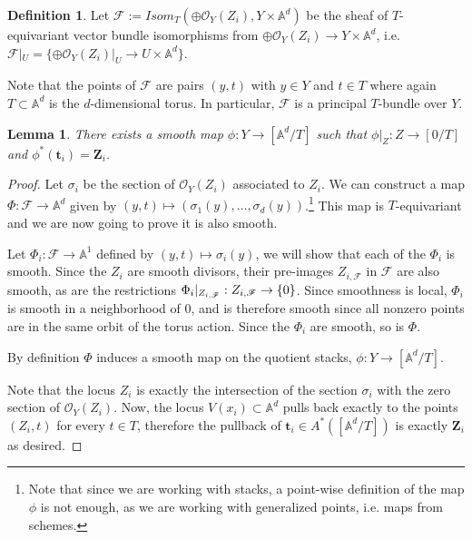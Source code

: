 \documentclass[11pt,oneside,english]{article}
\numberwithin{equation}{section}
\renewcommand*{\to}{\mathchoice{\longrightarrow}{\rightarrow}{\rightarrow}{\rightarrow}}
\newtheorem{lemma}[theorem]{Lemma}
\theoremstyle{definition}
\newtheorem{definition}[theorem]{Definition}
\newcommand{\ra}{\rightarrow}
\newcommand\A{\mathbb{A}}
\begin{document}
\begin{definition} Let $\mathscr{F}:=Isom_T(\oplus \mathcal{O}_Y(Z_i), Y \times \A^d )$ be the sheaf of $T$-equivariant vector bundle isomorphisms from $\oplus \mathcal O_Y(Z_i) \rightarrow Y \times \mathbb A^d$, i.e. $\mathscr F|_U = \{\oplus \mathcal{O}_Y(Z_i)|_U \ra U \times \A^d \}$.   
\end{definition}


Note that the points of $\mathscr F
$ are pairs $(y,t)$ with $y \in Y$ and $t \in T$ where again $T \subset \mathbb A^d $ is the $d$-dimensional torus. In particular, $\mathscr F$ is a principal $T$-bundle over $Y$.


\begin{lemma}\label{flower lemma} There exists a smooth map $\phi: Y \ra [\A^d/T]$ such that $\phi|_Z: Z \ra [0/T]$  and $\phi^*(\boldsymbol t_i)=\boldsymbol Z_i$.
\end{lemma}

\begin{proof}
Let $\sigma_i$ be the section of $\mathcal{O}_{Y}(Z_i)$ associated to $Z_i$.
We can construct a map $\Phi : \mathscr F \ra \A^d$ given by $(y,t) \mapsto (\sigma_1(y),...,\sigma_d(y))$.\footnote{Note that since we are working with stacks, a point-wise definition of the map $\phi$ is not enough, as we are working with generalized points, i.e. maps from schemes.}
This map is $T$-equivariant and we are now going to prove it is also smooth.

Let $\Phi_i: \mathscr F \ra \A^1$ defined by $(y,t) \mapsto \sigma_i(y)$, we will show that each of the $\Phi_i$ is smooth.  
Since the $Z_i$ are smooth divisors, their pre-images $Z_{i,\mathscr F}$ in $\mathscr F$ are also smooth, as are the restrictions $\Phi_i|_{Z_{i,\mathscr F}}:Z_{i,\mathscr F}\to \{ 0 \}$. Since smoothness is local, $\Phi_i$ is smooth in a neighborhood of 0, and is therefore smooth since all nonzero points are in the same orbit of the torus action. Since the $\Phi_i$ are smooth, so is $\Phi$.

By definition $\Phi$ induces a smooth map on the quotient stacks, $\phi: Y \ra [\A^d/T]$. 


Note that the locus $Z_i$ is exactly the intersection of the section $\sigma_i$ with the zero section of $\mathcal{O}_Y(Z_i)$. Now, the locus $V(x_i) \subset \A^d$ pulls back exactly to the points $(Z_i,t)$ for every $t \in T$, therefore the pullback of $\boldsymbol t_i \in A^*([\A^d/T])$ is exactly $\boldsymbol{Z}_i$ as desired. 
\end{proof}
\end{document}
